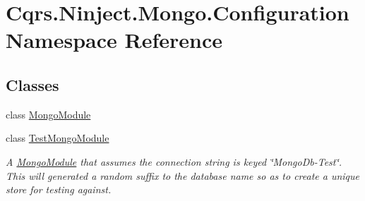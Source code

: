\hypertarget{namespaceCqrs_1_1Ninject_1_1Mongo_1_1Configuration}{}\section{Cqrs.\+Ninject.\+Mongo.\+Configuration Namespace Reference}
\label{namespaceCqrs_1_1Ninject_1_1Mongo_1_1Configuration}
\subsection*{Classes}
\begin{DoxyCompactItemize}
\item 
class \hyperlink{classCqrs_1_1Ninject_1_1Mongo_1_1Configuration_1_1MongoModule}{Mongo\+Module}
\item 
class \hyperlink{classCqrs_1_1Ninject_1_1Mongo_1_1Configuration_1_1TestMongoModule}{Test\+Mongo\+Module}
\begin{DoxyCompactList}\small\item\em A \hyperlink{classCqrs_1_1Ninject_1_1Mongo_1_1Configuration_1_1MongoModule}{Mongo\+Module} that assumes the connection string is keyed \char`\"{}\+Mongo\+Db-\/\+Test\char`\"{}. This will generated a random suffix to the database name so as to create a unique store for testing against. \end{DoxyCompactList}\end{DoxyCompactItemize}
